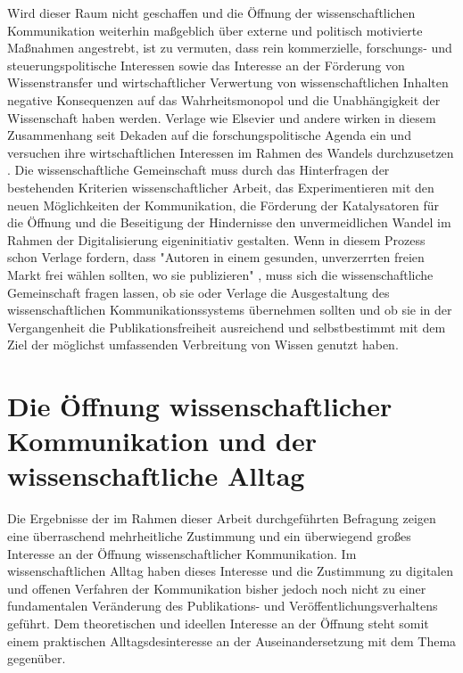 Wird dieser Raum nicht geschaffen und die Öffnung der wissenschaftlichen Kommunikation weiterhin maßgeblich über externe und politisch motivierte Maßnahmen angestrebt, ist zu vermuten, dass rein kommerzielle, forschungs- und steuerungspolitische Interessen sowie das Interesse an der Förderung von Wissenstransfer und wirtschaftlicher Verwertung von wissenschaftlichen Inhalten negative Konsequenzen auf das Wahrheitsmonopol und die Unabhängigkeit der Wissenschaft haben werden. Verlage wie Elsevier und andere wirken in diesem Zusammenhang seit Dekaden auf die forschungspolitische Agenda ein und versuchen ihre wirtschaftlichen Interessen im Rahmen des Wandels durchzusetzen \cite{Elsevier_2012}. Die wissenschaftliche Gemeinschaft muss durch das Hinterfragen der bestehenden Kriterien wissenschaftlicher Arbeit, das Experimentieren mit den neuen Möglichkeiten der Kommunikation, die Förderung der Katalysatoren für die Öffnung und die Beseitigung der Hindernisse den unvermeidlichen Wandel im Rahmen der Digitalisierung eigeninitiativ gestalten. Wenn in diesem Prozess schon Verlage fordern, dass "Autoren in einem gesunden, unverzerrten freien Markt frei wählen sollten, wo sie publizieren" \cite{Brussels_Declaration_2007}, muss sich die wissenschaftliche Gemeinschaft fragen lassen, ob sie oder Verlage die Ausgestaltung des wissenschaftlichen Kommunikationssystems übernehmen sollten und ob sie in der Vergangenheit die Publikationsfreiheit ausreichend und selbstbestimmt mit dem Ziel der möglichst umfassenden Verbreitung von Wissen genutzt haben.

\section{Die Öffnung wissenschaftlicher Kommunikation und der wissenschaftliche Alltag}

Die Ergebnisse der im Rahmen dieser Arbeit durchgeführten Befragung zeigen eine überraschend mehrheitliche Zustimmung und ein überwiegend großes Interesse an der Öffnung wissenschaftlicher Kommunikation. Im wissenschaftlichen Alltag haben dieses Interesse und die Zustimmung zu digitalen und offenen Verfahren der Kommunikation bisher jedoch noch nicht zu einer fundamentalen Veränderung des Publikations- und Veröffentlichungsverhaltens geführt. Dem theoretischen und ideellen Interesse an der Öffnung steht somit einem praktischen Alltagsdesinteresse an der Auseinandersetzung mit dem Thema gegenüber.

